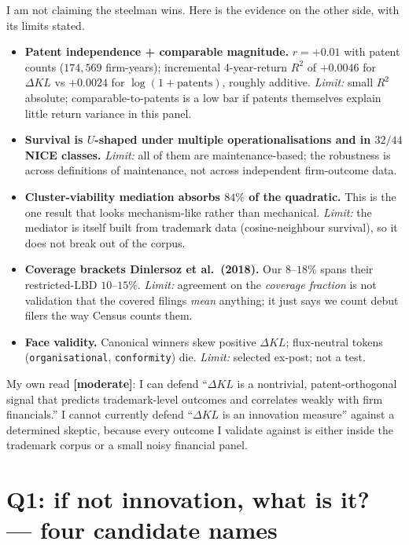 \documentclass[11pt]{article}
\newcommand{\dkl}{\Delta KL}
\begin{document}
I am not claiming the steelman wins. Here is the evidence on the
other side, with its limits stated.

\begin{itemize}[leftmargin=*]
\item \textbf{Patent independence + comparable magnitude.}
$r = +0.01$ with patent counts ($174{,}569$ firm-years); incremental
4-year-return $R^2$ of $+0.0046$ for $\dkl$ vs $+0.0024$ for
$\log(1+\text{patents})$, roughly additive. \emph{Limit:} small
$R^2$ absolute; comparable-to-patents is a low bar if patents
themselves explain little return variance in this panel.
\item \textbf{Survival is $U$-shaped under multiple
operationalisations and in $32/44$ NICE classes.} \emph{Limit:}
all of them are maintenance-based; the robustness is across
definitions of maintenance, not across independent firm-outcome
data.
\item \textbf{Cluster-viability mediation absorbs $84\%$ of the
quadratic.} This is the one result that looks mechanism-like rather
than mechanical. \emph{Limit:} the mediator is itself built from
trademark data (cosine-neighbour survival), so it does not break out
of the corpus.
\item \textbf{Coverage brackets Dinlersoz et al.\ (2018).} Our
$8$--$18\%$ spans their restricted-LBD $10$--$15\%$. \emph{Limit:}
agreement on the \emph{coverage fraction} is not validation that the
covered filings \emph{mean} anything; it just says we count debut
filers the way Census counts them.
\item \textbf{Face validity.} Canonical winners skew positive
$\dkl$; flux-neutral tokens (\texttt{organisational},
\texttt{conformity}) die. \emph{Limit:} selected ex-post; not a
test.
\end{itemize}

\noindent
My own read \textbf{[moderate]}: I can defend ``$\dkl$ is a
nontrivial, patent-orthogonal signal that predicts trademark-level
outcomes and correlates weakly with firm financials.'' I cannot
currently defend ``$\dkl$ is an innovation measure'' against a
determined skeptic, because every outcome I validate against is
either inside the trademark corpus or a small noisy financial panel.

\section{Q1: if not innovation, what is it? --- four candidate names}
\end{document}
